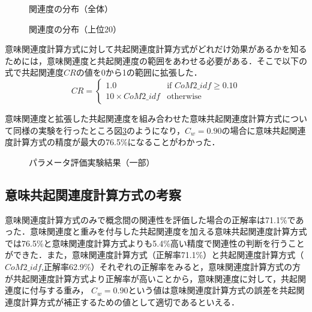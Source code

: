 \begin{figure}[tb]
\begin{center}
\end{center}
\caption{関連度の分布（全体）}
\label{Fig7}
\end{figure}

\begin{figure}[tb]
\begin{center}
\end{center}
\caption{関連度の分布（上位20）}
\label{Fig8}
\end{figure}

意味関連度計算方式に対して共起関連度計算方式がどれだけ効果があるかを知るためには，意味関連度と共起関連度の範囲をあわせる必要がある．そこで以下の式で共起関連度$CR$の値を0から1の範囲に拡張した．
\begin{equation}
 CR = \left\{ \begin{array}{ll}
              1.0                & \mbox{if $CoM2\_idf \ge 0.10$} \\
              10 \times CoM2\_idf & \mbox{otherwise}
              \end{array}
      \right.
\end{equation}

意味関連度と拡張した共起関連度を組み合わせた意味共起関連度計算方式について同様の実験を行ったところ図\ref{Fig9}のようになり，$C_w=0.90$の場合に意味共起関連度計算方式の精度が最大の76.5\%になることがわかった．

\begin{figure}[tb]
\begin{center}
\end{center}
\caption{パラメータ評価実験結果（一部）}
\label{Fig9}
\end{figure}

\subsection{意味共起関連度計算方式の考察}

意味関連度計算方式のみで概念間の関連性を評価した場合の正解率は71.1\%であった．意味関連度と重みを付与した共起関連度を加える意味共起関連度計算方式では76.5\%と意味関連度計算方式よりも5.4\%高い精度で関連性の判断を行うことができた．また，意味関連度計算方式（正解率71.1\%）と共起関連度計算方式（$CoM2\_idf$,正解率62.9\%）それぞれの正解率をみると，意味関連度計算方式の方が共起関連度計算方式より正解率が高いことから，意味関連度に対して，共起関連度に付与する重み， $C_w=0.90$という値は意味関連度計算方式の誤差を共起関連度計算方式が補正するための値として適切であるといえる．
 
